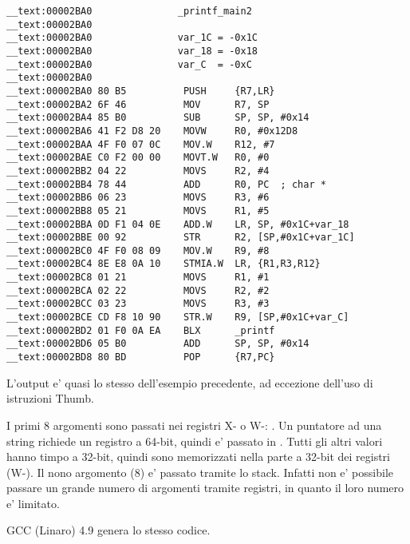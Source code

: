 \myparagraph{\OptimizingXcodeIV: \ThumbTwoMode}

\begin{lstlisting}[style=customasmARM]
__text:00002BA0               _printf_main2
__text:00002BA0
__text:00002BA0               var_1C = -0x1C
__text:00002BA0               var_18 = -0x18
__text:00002BA0               var_C  = -0xC
__text:00002BA0
__text:00002BA0 80 B5          PUSH     {R7,LR}
__text:00002BA2 6F 46          MOV      R7, SP
__text:00002BA4 85 B0          SUB      SP, SP, #0x14
__text:00002BA6 41 F2 D8 20    MOVW     R0, #0x12D8
__text:00002BAA 4F F0 07 0C    MOV.W    R12, #7
__text:00002BAE C0 F2 00 00    MOVT.W   R0, #0
__text:00002BB2 04 22          MOVS     R2, #4
__text:00002BB4 78 44          ADD      R0, PC  ; char *
__text:00002BB6 06 23          MOVS     R3, #6
__text:00002BB8 05 21          MOVS     R1, #5
__text:00002BBA 0D F1 04 0E    ADD.W    LR, SP, #0x1C+var_18
__text:00002BBE 00 92          STR      R2, [SP,#0x1C+var_1C]
__text:00002BC0 4F F0 08 09    MOV.W    R9, #8
__text:00002BC4 8E E8 0A 10    STMIA.W  LR, {R1,R3,R12}
__text:00002BC8 01 21          MOVS     R1, #1
__text:00002BCA 02 22          MOVS     R2, #2
__text:00002BCC 03 23          MOVS     R3, #3
__text:00002BCE CD F8 10 90    STR.W    R9, [SP,#0x1C+var_C]
__text:00002BD2 01 F0 0A EA    BLX      _printf
__text:00002BD6 05 B0          ADD      SP, SP, #0x14
__text:00002BD8 80 BD          POP      {R7,PC}
\end{lstlisting}

L'output e' quasi lo stesso dell'esempio precedente, ad eccezione dell'uso di istruzioni Thumb. 





I primi 8 argomenti sono passati nei registri X- o W-: \ARMPCS.
Un puntatore ad una string richiede un registro a 64-bit, quindi e' passato in .
Tutti gli altri valori hanno timpo \Tint a 32-bit, quindi sono memorizzati nella parte a 32-bit dei registri (W-).
Il nono argomento (8) e' passato tramite lo stack.
Infatti non e' possibile passare un grande numero di argomenti tramite registri, in quanto il loro numero e' limitato.

\Optimizing GCC (Linaro) 4.9 genera lo stesso codice.
